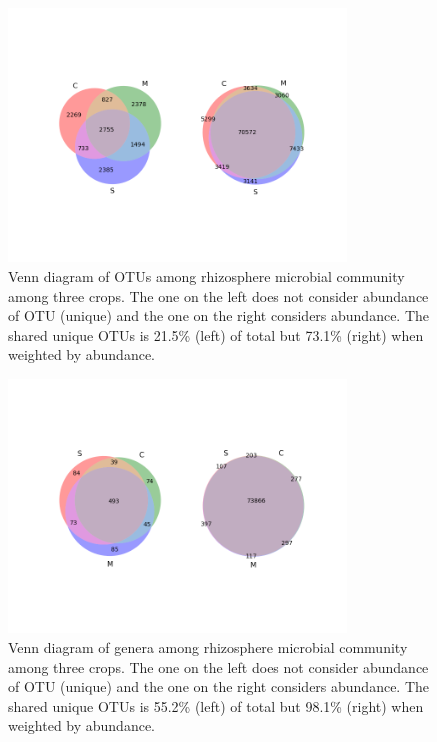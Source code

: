 \documentclass[12pt]{article}
\begin{document}
{    \begin{figure}[tbph!]
    \centering
    \includegraphics[width=0.8\textwidth]{figures/otu.venn}
    \caption[Venn diagram of OTUs]{Venn diagram of OTUs among rhizosphere microbial community among three crops. The one on the left does not consider abundance of OTU (unique) and the one on the right considers abundance. The shared unique OTUs is 21.5\% (left) of total but 73.1\% (right) when weighted by abundance.}
    \label{fig:otu.venn}
    \end{figure}


    \begin{figure}[tbph!]
    \centering
    \includegraphics[width=0.8\textwidth]{figures/genus.venn}
    \caption[Venn diagram of genera]{Venn diagram of genera among rhizosphere microbial community among three crops. The one on the left does not consider abundance of OTU (unique) and the one on the right considers abundance. The shared unique OTUs is 55.2\% (left) of total but 98.1\% (right) when weighted by abundance.}
    \label{fig:genus.venn}
    \end{figure}


}
\end{document}
